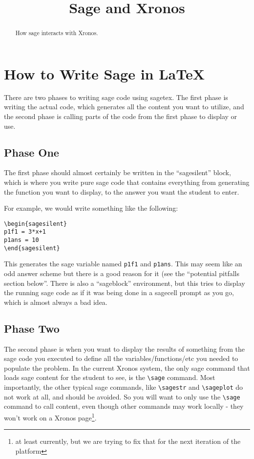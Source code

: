 \documentclass{ximera}
\title{Sage and Xronos}
\begin{document}
\begin{abstract}
     How sage interacts with Xronos.
\end{abstract}
\maketitle


\section{How to Write Sage in LaTeX}

There are two phases to writing sage code using sagetex. The first phase is writing the actual code, which generates all the content you want to utilize, and the second phase is calling parts of the code from the first phase to display or use.

\subsection{Phase One}

The first phase should almost certainly be written in the ``sagesilent'' block, which is where you write pure sage code that contains everything from generating the function you want to display, to the answer you want the student to enter.

For example, we would write something like the following:
\begin{verbatim}
\begin{sagesilent}
p1f1 = 3*x+1
p1ans = 10
\end{sagesilent}
\end{verbatim}
This generates the sage variable named \verb|p1f1| and \verb|p1ans|. This may seem like an odd answer scheme but there is a good reason for it (see the ``potential pitfalls section below''. There is also a ``sageblock'' environment, but this tries to display the running sage code as if it was being done in a sagecell prompt as you go, which is almost always a bad idea.

\subsection{Phase Two}

The second phase is when you want to display the results of something from the sage code you executed to define all the variables/functions/etc you needed to populate the problem. In the current Xronos system, the only sage command that loads sage content for the student to see, is the \verb|\sage| command. Most importantly, the other typical sage commands, like \verb|\sagestr| and \verb|\sageplot| do not work at all, and should be avoided. So you will want to only use the \verb|\sage| command to call content, even though other commands may work locally - they won't work on a Xronos page\footnote{at least currently, but we are trying to fix that for the next iteration of the platform}.
\end{document}

